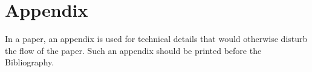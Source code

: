 \clearpage
\appendix
\part*{Appendix}

In a paper, an appendix is used for technical details that would otherwise disturb the flow of the paper.
Such an appendix should be printed before the Bibliography.

\printbibliography
% 
% 

% 



% 


